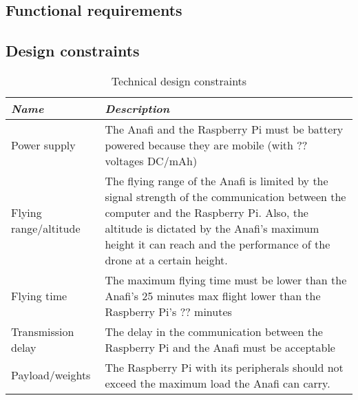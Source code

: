 \documentclass[../main.tex]{subfiles}
\begin{document}
\subsection{Functional requirements}

\blindtext
\newpage
\subsection{Design constraints}

\begin{table}[hbt!]
    \centering
    \caption{Technical design constraints}
    \label{tab:technical-design-constraints}
    \begin{tabular}{ P{2.8cm} P{12.2cm} }
        \toprule
        \textit{Name} 
            & \textit{Description} \\

        \midrule

        Power supply  
            & The Anafi and the Raspberry Pi must be 
            battery powered because they are mobile 
            (with ?? voltages DC/mAh)  \\

        Flying range/altitude 
            & The flying range of the Anafi is limited 
            by the signal strength of the communication 
            between the computer and the Raspberry Pi. 
            Also, the altitude is dictated by the Anafi’s 
            maximum height it can reach and the performance 
            of the drone at a certain height. \\

        Flying time  
            & The maximum flying time must be lower than 
            the Anafi’s 25 minutes max flight lower than 
            the Raspberry Pi’s ?? minutes \\ 

        Transmission delay  
            & The delay in the communication between 
            the Raspberry Pi and the Anafi must be acceptable \\

        Payload/weights  
            & The Raspberry Pi with its peripherals should not 
            exceed the maximum load the Anafi can carry. \\

        \bottomrule
    \end{tabular}
\end{table}
\end{document}

